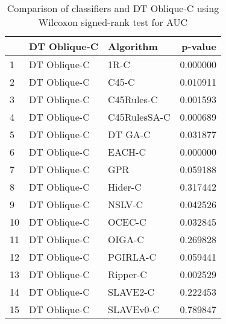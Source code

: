 \begin{table}
\footnotesize
\caption{Comparison of classifiers and DT Oblique-C using Wilcoxon signed-rank test for AUC}
\label{tab:DT Oblique-C wilcoxon AUC comparison}
\begin{tabular}{lllr}
\hline
 & DT Oblique-C & Algorithm & p-value \\
\hline
1 & DT Oblique-C & 1R-C & 0.000000 \\
2 & DT Oblique-C & C45-C & 0.010911 \\
3 & DT Oblique-C & C45Rules-C & 0.001593 \\
4 & DT Oblique-C & C45RulesSA-C & 0.000689 \\
5 & DT Oblique-C & DT GA-C & 0.031877 \\
6 & DT Oblique-C & EACH-C & 0.000000 \\
7 & DT Oblique-C & GPR & 0.059188 \\
8 & DT Oblique-C & Hider-C & 0.317442 \\
9 & DT Oblique-C & NSLV-C & 0.042526 \\
10 & DT Oblique-C & OCEC-C & 0.032845 \\
11 & DT Oblique-C & OIGA-C & 0.269828 \\
12 & DT Oblique-C & PGIRLA-C & 0.059441 \\
13 & DT Oblique-C & Ripper-C & 0.002529 \\
14 & DT Oblique-C & SLAVE2-C & 0.222453 \\
15 & DT Oblique-C & SLAVEv0-C & 0.789847 \\
\hline
\end{tabular}
\end{table}
